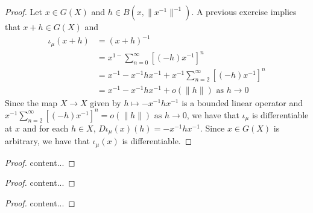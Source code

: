 \documentclass{book}
\begin{document}
\begin{proof}
	Let $x \in G(X)$ and $h \in B(x, \|x^{-1}\|^{-1})$. A previous exercise implies that $x + h \in G(X)$ and 
	\begin{align*}
		\iota_{\mu}(x+h) 
		& = (x+h)^{-1} \\
		& = x^{1-} \sum_{n=0}^{\infty} [(-h) x^{-1}]^n \\
		& = x^{-1} - x^{-1}hx^{-1} + x^{-1}\sum_{n=2}^{\infty} [(-h) x^{-1}]^n \\
		& = x^{-1} - x^{-1}hx^{-1} + o(\|h\|) \text{ as $h \rightarrow 0$}
	\end{align*}
	Since the map $X \rightarrow X$ given by $h \mapsto - x^{-1}hx^{-1}$ is a bounded linear operator and  $x^{-1}\sum\limits_{n=2}^{\infty} [(-h) x^{-1}]^n = o(\|h\|) \text{ as $h \rightarrow 0$}$, we have that $\iota_{\mu}$ is differentiable at $x$ and for each $h \in X$, $D\iota_{\mu}(x)(h) = - x^{-1}hx^{-1}$. Since $x \in G(X)$ is arbitrary, we have that $\iota_{\mu}(x)$ is differentiable. 
\end{proof}


\begin{ex}
	
\end{ex}

\begin{proof}
	content...
\end{proof}

\begin{ex}
	
\end{ex}

\begin{proof}
	content...
\end{proof}


\begin{ex}
	
\end{ex}

\begin{proof}
	content...
\end{proof}
\end{document}
